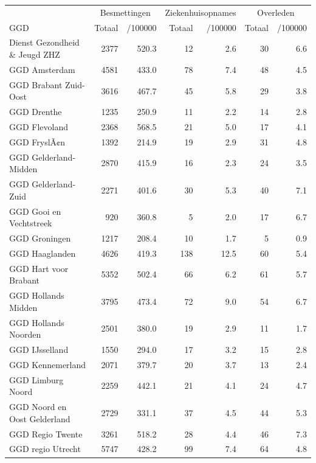 \documentclass[
  english,
  man,floatsintext]{apa6}
\begin{document}
\begin{table}[H]
\centering\begingroup\fontsize{10}{12}\selectfont

\begin{threeparttable}
\begin{tabular}{lrrrrrr}
\toprule
\multicolumn{1}{c}{ } & \multicolumn{2}{c}{Besmettingen} & \multicolumn{2}{c}{Ziekenhuisopnames} & \multicolumn{2}{c}{Overleden} \\
\cmidrule(l{3pt}r{3pt}){2-3} \cmidrule(l{3pt}r{3pt}){4-5} \cmidrule(l{3pt}r{3pt}){6-7}
GGD & Totaal & /100000 & Totaal & /100000 & Totaal & /100000\\
\midrule
Dienst Gezondheid \& Jeugd ZHZ & 2377 & 520.3 & 12 & 2.6 & 30 & 6.6\\
GGD Amsterdam & 4581 & 433.0 & 78 & 7.4 & 48 & 4.5\\
GGD Brabant Zuid-Oost & 3616 & 467.7 & 45 & 5.8 & 29 & 3.8\\
GGD Drenthe & 1235 & 250.9 & 11 & 2.2 & 14 & 2.8\\
GGD Flevoland & 2368 & 568.5 & 21 & 5.0 & 17 & 4.1\\
GGD FryslÃ¢n & 1392 & 214.9 & 19 & 2.9 & 31 & 4.8\\
GGD Gelderland-Midden & 2870 & 415.9 & 16 & 2.3 & 24 & 3.5\\
GGD Gelderland-Zuid & 2271 & 401.6 & 30 & 5.3 & 40 & 7.1\\
GGD Gooi en Vechtstreek & 920 & 360.8 & 5 & 2.0 & 17 & 6.7\\
GGD Groningen & 1217 & 208.4 & 10 & 1.7 & 5 & 0.9\\
GGD Haaglanden & 4626 & 419.3 & 138 & 12.5 & 60 & 5.4\\
GGD Hart voor Brabant & 5352 & 502.4 & 66 & 6.2 & 61 & 5.7\\
GGD Hollands Midden & 3795 & 473.4 & 72 & 9.0 & 54 & 6.7\\
GGD Hollands Noorden & 2501 & 380.0 & 19 & 2.9 & 11 & 1.7\\
GGD IJsselland & 1550 & 294.0 & 17 & 3.2 & 15 & 2.8\\
GGD Kennemerland & 2071 & 379.7 & 20 & 3.7 & 13 & 2.4\\
GGD Limburg Noord & 2259 & 442.1 & 21 & 4.1 & 24 & 4.7\\
GGD Noord en Oost Gelderland & 2729 & 331.1 & 37 & 4.5 & 44 & 5.3\\
GGD Regio Twente & 3261 & 518.2 & 28 & 4.4 & 46 & 7.3\\
GGD regio Utrecht & 5747 & 428.2 & 99 & 7.4 & 64 & 4.8\\

\end{tabular}
\end{threeparttable}
\end{table}
\end{document}
